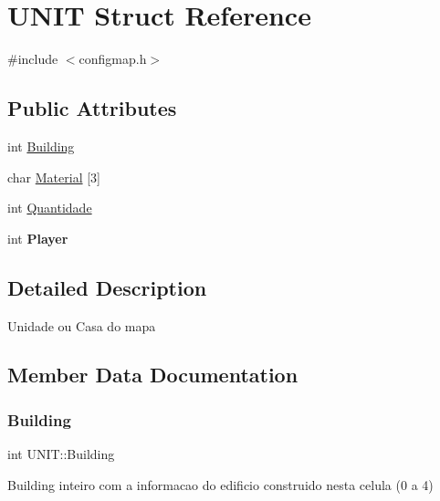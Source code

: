 \hypertarget{struct_u_n_i_t}{}\section{U\+N\+IT Struct Reference}
\label{struct_u_n_i_t}


{\ttfamily \#include $<$configmap.\+h$>$}

\subsection*{Public Attributes}
\begin{DoxyCompactItemize}
\item 
int \mbox{\hyperlink{struct_u_n_i_t_ae9c30c2033387371329a35aa7c628ebc}{Building}}
\item 
char \mbox{\hyperlink{struct_u_n_i_t_a8e11b1a42f3f380755b3864a45a13df9}{Material}} \mbox{[}3\mbox{]}
\item 
int \mbox{\hyperlink{struct_u_n_i_t_a1878ea7b1f85a363ffd2ceeefff6e1ee}{Quantidade}}
\item 
\mbox{\label{struct_u_n_i_t_a11a3895518aae78690a3dd00511d8e4a}} 
int {\bfseries Player}
\end{DoxyCompactItemize}


\subsection{Detailed Description}
Unidade ou Casa do mapa 

\subsection{Member Data Documentation}
\mbox{\label{struct_u_n_i_t_ae9c30c2033387371329a35aa7c628ebc}} 
\subsubsection{\texorpdfstring{Building}{Building}}
{\footnotesize\ttfamily int U\+N\+I\+T\+::\+Building}

Building inteiro com a informacao do edificio construido nesta celula (0 a 4) \mbox{\label{struct_u_n_i_t_a8e11b1a42f3f380755b3864a45a13df9}} 
